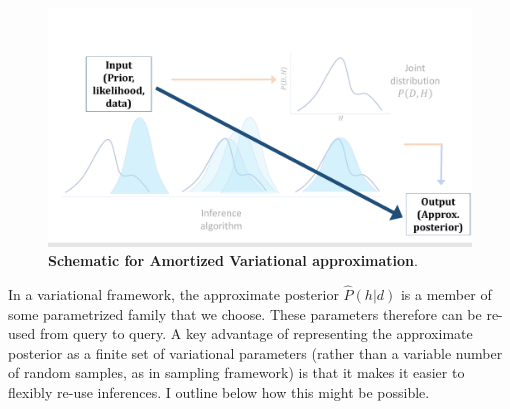 \begin{figure}[t!]
\centering
\includegraphics[width = \textwidth]{figures/var_schematic_amort.pdf}
\caption{\textbf{Schematic for Amortized Variational approximation}. }
\label{fig:var_schematic_amort}
\end{figure}

In a variational framework, the approximate posterior $\hat{P}(h | d)$ is a member of some parametrized family that we choose. These parameters therefore can be re-used from query to query. A key advantage of representing the approximate posterior as a finite set of variational parameters (rather than a variable number of random samples, as in sampling framework) is that it makes it easier to flexibly re-use inferences. I outline below how this might be possible.

